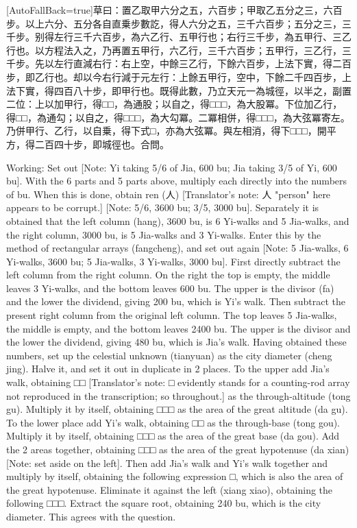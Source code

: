 \documentclass[11pt]{article}
\newcommand{\zhsmall}{\footnotesize\color{black!70}}
\newcommand{\unitlabel}[1]{\marginpar{\raggedleft\tiny\color{gray}#1}}
\newenvironment{unitzh}{\par\CJKfontspec{Noto Serif CJK SC}[AutoFallBack=true]\large\linespread{1.25}\selectfont}{\par}
\newenvironment{uniten}{\par\small\color{black!85}}{\par\medskip}
\begin{document}
\begin{unitzh}\unitlabel{ceyuan-033.3}草曰：置{\zhsmall 乙取甲六分之五，六百步；甲取乙五分之三，六百步}。以上六分、五分各自直乗步數訖，得人{\zhsmall 六分之五，三千六百步；五分之三，三千步}。别得左行三千六百步，為六乙行、五甲行也；右行三千步，為五甲行、三乙行也。以方程法入之，乃再置{\zhsmall 五甲行，六乙行，三千六百步；五甲行，三乙行，三千步}。先以左行直減右行：右上空，中餘三乙行，下餘六百步，上法下實，得二百步，即乙行也。却以今右行減于元左行：上餘五甲行，空中，下餘二千四百步，上法下實，得四百八十步，即甲行也。既得此數，乃立天元一為城徑，以半之，副置二位：上以加甲行，得□□，為通股；以自之，得□□□，為大股冪。下位加乙行，得□□，為通勾；以自之，得□□□，為大勾冪。二冪相併，得□□□，為大弦冪{\zhsmall 寄左}。乃併甲行、乙行，以自乗，得下式□，亦為大弦冪。與左相消，得下□□□，開平方，得二百四十步，即城徑也。合問。\end{unitzh}
\begin{uniten}Working: Set out [Note: Yi taking 5/6 of Jia, 600 bu; Jia taking 3/5 of Yi, 600 bu]. With the 6 parts and 5 parts above, multiply each directly into the numbers of bu. When this is done, obtain ren (人) [Translator's note: 人 "person" here appears to be corrupt.] [Note: 5/6, 3600 bu; 3/5, 3000 bu]. Separately it is obtained that the left column (hang), 3600 bu, is 6 Yi-walks and 5 Jia-walks, and the right column, 3000 bu, is 5 Jia-walks and 3 Yi-walks. Enter this by the method of rectangular arrays (fangcheng), and set out again [Note: 5 Jia-walks, 6 Yi-walks, 3600 bu; 5 Jia-walks, 3 Yi-walks, 3000 bu]. First directly subtract the left column from the right column. On the right the top is empty, the middle leaves 3 Yi-walks, and the bottom leaves 600 bu. The upper is the divisor (fa) and the lower the dividend, giving 200 bu, which is Yi's walk. Then subtract the present right column from the original left column. The top leaves 5 Jia-walks, the middle is empty, and the bottom leaves 2400 bu. The upper is the divisor and the lower the dividend, giving 480 bu, which is Jia's walk. Having obtained these numbers, set up the celestial unknown (tianyuan) as the city diameter (cheng jing). Halve it, and set it out in duplicate in 2 places. To the upper add Jia's walk, obtaining □□ [Translator's note: □ evidently stands for a counting-rod array not reproduced in the transcription; so throughout.] as the through-altitude (tong gu). Multiply it by itself, obtaining □□□ as the area of the great altitude (da gu). To the lower place add Yi's walk, obtaining □□ as the through-base (tong gou). Multiply it by itself, obtaining □□□ as the area of the great base (da gou). Add the 2 areas together, obtaining □□□ as the area of the great hypotenuse (da xian) [Note: set aside on the left]. Then add Jia's walk and Yi's walk together and multiply by itself, obtaining the following expression □, which is also the area of the great hypotenuse. Eliminate it against the left (xiang xiao), obtaining the following □□□. Extract the square root, obtaining 240 bu, which is the city diameter. This agrees with the question.\end{uniten}
\end{document}
